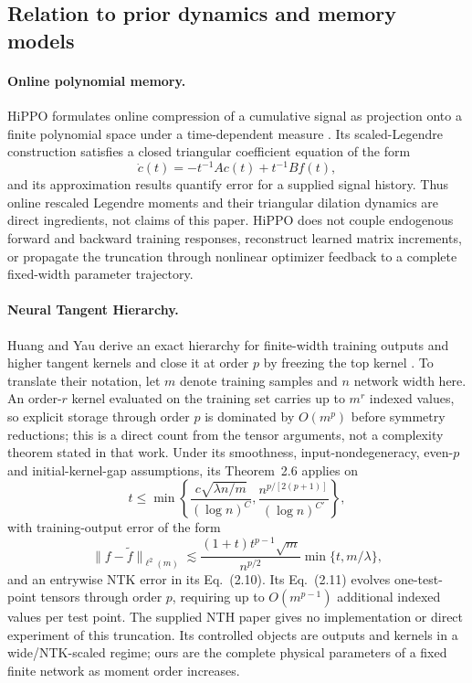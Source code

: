\documentclass[11pt]{article}
\theoremstyle{definition}
\theoremstyle{remark}
\begin{document}
\subsection{Relation to prior dynamics and memory models}

\paragraph{Online polynomial memory.}
HiPPO formulates online compression of a cumulative signal as projection onto a
finite polynomial space under a time-dependent measure
\citep{gu2020hippo}.  Its scaled-Legendre construction satisfies a closed
triangular coefficient equation of the form
\[
 \dot c(t)=-t^{-1}Ac(t)+t^{-1}Bf(t),
\]
and its approximation results quantify error for a supplied signal history.
Thus online rescaled Legendre moments and their triangular dilation dynamics are
direct ingredients, not claims of this paper.  HiPPO does not couple endogenous
forward and backward training responses, reconstruct learned matrix increments,
or propagate the truncation through nonlinear optimizer feedback to a complete
fixed-width parameter trajectory.

\paragraph{Neural Tangent Hierarchy.}
Huang and Yau derive an exact hierarchy for finite-width training outputs and
higher tangent kernels and close it at order $p$ by freezing the top kernel
\citep{huang2020nth}.  To translate their notation, let $m$ denote training
samples and $n$ network width here.  An order-$r$ kernel evaluated on the
training set carries up to $m^r$ indexed values, so explicit storage through
order $p$ is dominated by $O(m^p)$ before symmetry reductions; this is a direct
count from the tensor arguments, not a complexity theorem stated in that work.
Under its smoothness, input-nondegeneracy, even-$p$ and initial-kernel-gap
assumptions, its Theorem~2.6 applies on
\[
 t\le\min\left\{
 \frac{c\sqrt{\lambda n/m}}{(\log n)^C},
 \frac{n^{p/[2(p+1)]}}{(\log n)^{C'}}
 \right\},
\]
with training-output error of the form
\[
 \|f-\widetilde f\|_{\ell^2(m)}
 \lesssim
 \frac{(1+t)t^{p-1}\sqrt m}{n^{p/2}}
 \min\{t,m/\lambda\},
\]
and an entrywise NTK error in its Eq.~(2.10).  Its Eq.~(2.11) evolves
one-test-point tensors through order $p$, requiring up to $O(m^{p-1})$
additional indexed values per test point.  The supplied NTH paper gives no
implementation or direct experiment of this truncation.  Its controlled objects
are outputs and kernels in a wide/NTK-scaled regime; ours are the complete
physical parameters of a fixed finite network as moment order increases.
\end{document}
